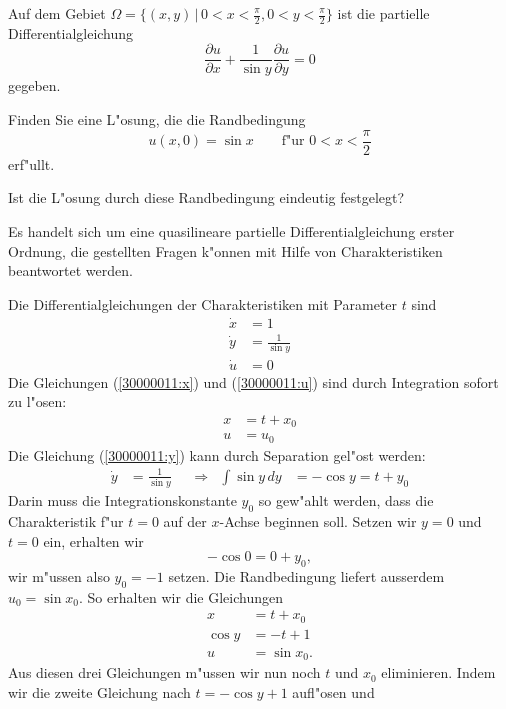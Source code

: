 Auf dem Gebiet $\Omega=\{(x,y)\,|\,0<x<\frac{\pi}2,0<y<\frac{\pi}2\}$
ist die partielle Differentialgleichung
\begin{equation}
\frac{\partial u}{\partial x}
+
\frac1{\sin y}\frac{\partial u}{\partial y}
=
0
\label{30000011:equation}
\end{equation}
gegeben.
\begin{teilaufgaben}
\item
Finden Sie eine L"osung, die die Randbedingung
\[
u(x,0)=\sin x\qquad \text{f"ur $0<x<\frac{\pi}2$}
\]
erf"ullt.
\item
Ist die L"osung durch diese Randbedingung eindeutig festgelegt?
\end{teilaufgaben}

\begin{loesung}
Es handelt sich um eine quasilineare partielle Differentialgleichung erster
Ordnung, die gestellten Fragen k"onnen mit Hilfe von Charakteristiken
beantwortet werden.
\begin{teilaufgaben}
\item
Die Differentialgleichungen der Charakteristiken mit Parameter $t$ sind
\begin{align}
\dot x&=1
\label{30000011:x}
\\
\dot y&=\frac1{\sin y}
\label{30000011:y}
\\
\dot u&=0
\label{30000011:u}
\end{align}
Die Gleichungen (\ref{30000011:x}) und (\ref{30000011:u}) sind durch
Integration sofort zu l"osen:
\begin{align*}
x&=t+x_0\\
u&=u_0
\end{align*}
Die Gleichung (\ref{30000011:y}) kann durch Separation gel"ost werden:
\[
\begin{aligned}
\dot y&=\frac1{\sin y}
&&\Rightarrow&
\int \sin y\,dy&=-\cos y=t+y_0
\end{aligned}
\]
Darin muss die Integrationskonstante $y_0$ so gew"ahlt werden,
dass die Charakteristik f"ur $t=0$ auf der $x$-Achse beginnen soll.
Setzen wir $y=0$ und $t=0$ ein, erhalten wir
\[
-\cos 0=0+y_0,
\]
wir m"ussen also $y_0=-1$ setzen.
Die Randbedingung liefert ausserdem $u_0=\sin x_0$. So
erhalten wir die Gleichungen
\begin{align*}
x&=t+x_0\\
\cos y&=-t+1\\
u&=\sin x_0.
\end{align*}
Aus diesen drei Gleichungen m"ussen wir nun noch $t$ und $x_0$ eliminieren.
Indem wir die zweite Gleichung nach $t=-\cos y + 1$ aufl"osen und

\end{teilaufgaben}
\end{loesung}
